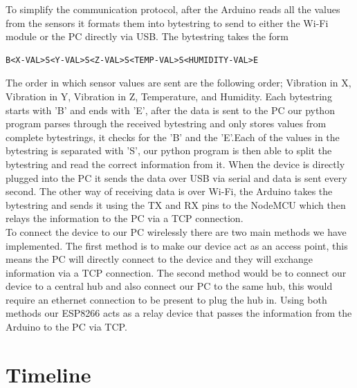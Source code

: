 \documentclass[12pt, titlepage]{article}
\begin{document}
To simplify the communication protocol, after the Arduino reads all the values from the sensors it formats them into bytestring to send to either the Wi-Fi module or the PC directly via USB. The bytestring takes the form

\begin{verbatim}
B<X-VAL>S<Y-VAL>S<Z-VAL>S<TEMP-VAL>S<HUMIDITY-VAL>E
\end{verbatim}

The order in which sensor values are sent are the following order; Vibration in X, Vibration in Y, Vibration in Z, Temperature, and Humidity. Each bytestring starts with 'B' and ends with 'E', after the data is sent to the PC our python program parses through the received bytestring and only stores values from complete bytestrings, it checks for the 'B' and the 'E'.Each of the values in the bytestring is separated with 'S', our python program is then able to split the bytestring and read the correct information from it. When the device is directly plugged into the PC it sends the data over USB via serial and data is sent every second. The other way of receiving data is over Wi-Fi, the Arduino takes the bytestring and sends it using the TX and RX pins to the NodeMCU which then relays the information to the PC via a TCP connection.\\

To connect the device to our PC wirelessly there are two main methods we have implemented. The first method is to make our device act as an access point, this means the PC will directly connect to the device and they will exchange information via a TCP connection. The second method would be to connect our device to a central hub and also connect our PC to the same hub, this would require an ethernet connection to be present to plug the hub in. Using both methods our ESP8266 acts as a relay device that passes the information from the Arduino to the PC via TCP.


\newpage
\section{Timeline}
\end{document}
